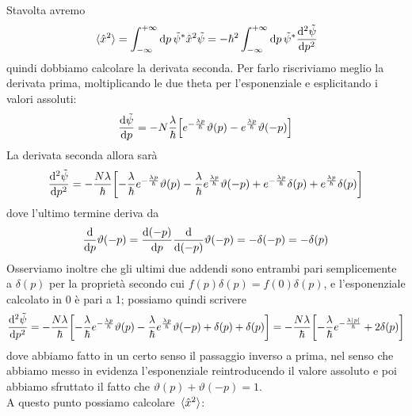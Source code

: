 \begin{soluzione}
\begin{itemize}[leftmargin=0.5cm]
   Stavolta avremo
   \begin{equation*}
      \expval*{\hat{x}^2}
      =\int_{-\infty}^{+\infty} \dd{p} \tilde{\psi}^* \hat{x}^2 \tilde{\psi}
      =-\hbar^2 \int_{-\infty}^{+\infty} \dd{p} \tilde{\psi}^* \dv[2]{\tilde{\psi}}{p}
   \end{equation*}
   quindi dobbiamo calcolare la derivata seconda. Per farlo riscriviamo meglio la derivata prima, moltiplicando le due theta per l'esponenziale e esplicitando i valori assoluti:
   \begin{equation*}
      \dv{\tilde{\psi}}{p}=-N\frac{\lambda}{\hbar} \qty[ e^{-\frac{\lambda p}{\hbar}}\vartheta(p) - e^{\frac{\lambda p}{\hbar}} \vartheta(-p) ]
     \end{equation*}
   La derivata seconda allora sarà
   \begin{equation*}
      \dv[2]{\tilde{\psi}}{p}
      =-\frac{N\lambda}{\hbar} \qty[
         -\frac{\lambda}{\hbar} e^{-\frac{\lambda p}{\hbar}}\vartheta(p)
         -\frac{\lambda}{\hbar} e^{\frac{\lambda p}{\hbar}} \vartheta(-p)
         + e^{-\frac{\lambda p}{\hbar}} \delta(p)
         +e^{\frac{\lambda p}{\hbar}} \delta(p) ]
   \end{equation*}
   dove l'ultimo termine deriva da
   \begin{equation*}
      \dv{p}\vartheta(-p)=\dv{(-p)}{p}\dv{(-p)}\vartheta(-p)=-\delta(-p)=-\delta(p)
   \end{equation*}
   Osserviamo inoltre che gli ultimi due addendi sono entrambi pari semplicemente a $\delta(p)$ per la proprietà secondo cui $f(p)\delta(p)=f(0)\delta(p)$, e l'esponenziale calcolato in 0 è pari a 1; possiamo quindi scrivere
   \begin{equation*}
      \dv[2]{\tilde{\psi}}{p}
      =-\frac{N\lambda}{\hbar} \qty[
         -\frac{\lambda}{\hbar} e^{-\frac{\lambda p}{\hbar}}\vartheta(p)
         -\frac{\lambda}{\hbar} e^{\frac{\lambda p}{\hbar}} \vartheta(-p)
         + \delta(p)
         + \delta(p) ]
      =-\frac{N\lambda}{\hbar} \qty[ -\frac{\lambda}{\hbar} e^{-\frac{\lambda |p|}{\hbar}} + 2\delta(p) ]
   \end{equation*}
   dove abbiamo fatto in un certo senso il passaggio inverso a prima, nel senso che abbiamo messo in evidenza l'esponenziale reintroducendo il valore assoluto e poi abbiamo sfruttato il fatto che $\vartheta(p) + \vartheta(-p)=1$.\\
   A questo punto possiamo calcolare $\expval*{\hat{x}^2}$:
   \begin{equation*}
      \begin{split}

\end{split}
\end{equation*}
\end{itemize}
\end{soluzione}
